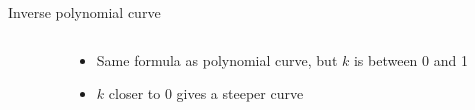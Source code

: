 \begin{frame}{Inverse polynomial curve}
    \begin{columns}
        \begin{column}{0.57\textwidth}
            \begin{center}
            \end{center}
        \end{column}
        \begin{column}{0.4\textwidth}
            \begin{itemize}
                \pause\item Same formula as polynomial curve, but $k$ is between 0 and 1
                \pause\item $k$ closer to $0$ gives a steeper curve
            \end{itemize}
        \end{column}
    \end{columns}
\end{frame}

